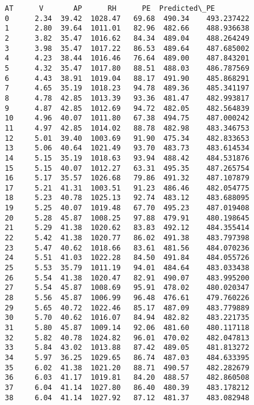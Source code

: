 \documentclass[11pt]{article}
\makeatletter
\newcommand{\boxspacing}{\kern\kvtcb@left@rule\kern\kvtcb@boxsep}
\newcommand{\prompt}[4]{
        {\ttfamily\llap{{\color{#2}[#3]:\hspace{3pt}#4}}\vspace{-\baselineskip}}
    }
\makeatother
\begin{document}
            \begin{tcolorbox}[breakable, size=fbox, boxrule=.5pt, pad at break*=1mm, opacityfill=0]
\prompt{Out}{outcolor}{52}{\boxspacing}
\begin{Verbatim}[commandchars=\\\{\}]
         AT      V       AP      RH      PE  Predicted\_PE
0      2.34  39.42  1028.47   69.68  490.34    493.237422
1      2.80  39.64  1011.01   82.96  482.66    488.936638
2      3.82  35.47  1016.62   84.34  489.04    488.264249
3      3.98  35.47  1017.22   86.53  489.64    487.685002
4      4.23  38.44  1016.46   76.64  489.00    487.843201
5      4.32  35.47  1017.80   88.51  488.03    486.787569
6      4.43  38.91  1019.04   88.17  491.90    485.868291
7      4.65  35.19  1018.23   94.78  489.36    485.341197
8      4.78  42.85  1013.39   93.36  481.47    482.993817
9      4.87  42.85  1012.69   94.72  482.05    482.564839
10     4.96  40.07  1011.80   67.38  494.75    487.000242
11     4.97  42.85  1014.02   88.78  482.98    483.346753
12     5.01  39.40  1003.69   91.90  475.34    482.833653
13     5.06  40.64  1021.49   93.70  483.73    483.614534
14     5.15  35.19  1018.63   93.94  488.42    484.531876
15     5.15  40.07  1012.27   63.31  495.35    487.265754
16     5.17  35.57  1026.68   79.86  491.32    487.107879
17     5.21  41.31  1003.51   91.23  486.46    482.054775
18     5.23  40.78  1025.13   92.74  483.12    483.688095
19     5.25  40.07  1019.48   67.70  495.23    487.019408
20     5.28  45.87  1008.25   97.88  479.91    480.198645
21     5.29  41.38  1020.62   83.83  492.12    484.355414
22     5.42  41.38  1020.77   86.02  491.38    483.797398
23     5.47  40.62  1018.66   83.61  481.56    484.070236
24     5.51  41.03  1022.28   84.50  491.84    484.055726
25     5.53  35.79  1011.19   94.01  484.64    483.033438
26     5.54  41.38  1020.47   82.91  490.07    483.995200
27     5.54  45.87  1008.69   95.91  478.02    480.020347
28     5.56  45.87  1006.99   96.48  476.61    479.760226
29     5.65  40.72  1022.46   85.17  487.09    483.779889
30     5.70  40.62  1016.07   84.94  482.82    483.221735
31     5.80  45.87  1009.14   92.06  481.60    480.117118
32     5.82  40.78  1024.82   96.01  470.02    482.047813
33     5.84  43.02  1013.88   87.42  489.05    481.813272
34     5.97  36.25  1029.65   86.74  487.03    484.633395
35     6.02  41.38  1021.20   88.71  490.57    482.282679
36     6.03  41.17  1019.81   84.20  488.57    482.860508
37     6.04  41.14  1027.80   86.40  480.39    483.178212
38     6.04  41.14  1027.92   87.12  481.37    483.082948

\end{Verbatim}
\end{tcolorbox}
\end{document}
